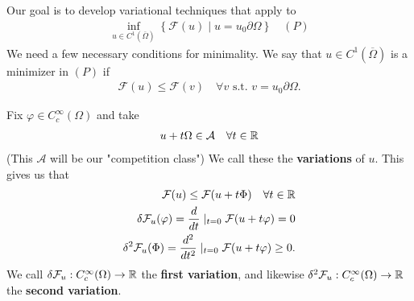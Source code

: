 \documentclass{memoir}
\begin{document}
Our goal is to develop variational techniques that apply to
\begin{align*}
	\inf_{u \in C^{1}(\overline{\Omega }) } \left\{\mathcal{F}(u) \mid u = u_0 \partial \Omega  \right\} \quad (P)
\end{align*}
We need a few necessary conditions for minimality. We say that \(u \in C^{1}(\overline{\Omega })\) is a minimizer in \((P)\) if
\begin{align*}
	\mathcal{F}(u) \leq \mathcal{F}(v) \quad \forall v \text{ s.t. }v = u_0 \partial \Omega .
\end{align*}

\begin{defn}[Variations]
Fix \(\varphi  \in C^{\infty}_c(\Omega )\) and take
\begin{align*}
	u + t \Omega \in \mathcal{A} \quad \forall t \in \mathbb{R}
\end{align*}
(This \(\mathcal{A}\) will be our "competition class") We call these the \textbf{variations} of \(u\). This gives us that
\begin{align*}
	\mathcal{F}(u) \leq \mathcal{F}(u+t\Phi ) \quad \forall t \in \mathbb{R}\\
	\delta \mathcal{F}_u (\varphi ) = \frac{d}{dt}\mid_{t = 0} \mathcal{F}(u+t\varphi ) = 0\\
	\delta^2 \mathcal{F}_u (\Phi ) = \frac{d^2}{dt^2}\mid_{t = 0}\mathcal{F}(u+t\varphi )\geq 0.
\end{align*}
We call \(\delta \mathcal{F}_u: C^{\infty}_c(\Omega ) \to \mathbb{R}\) the \textbf{first variation}, and likewise \(\delta^2\mathcal{F}_u:C^{\infty}_c(\Omega ) \to \mathbb{R}\) the \textbf{second variation}.\\
\end{defn}
\end{document}
